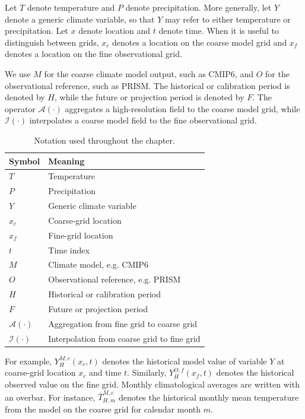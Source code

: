 \documentclass[11pt]{article}
\begin{document}
Let $T$ denote temperature and $P$ denote precipitation. More generally, let $Y$ denote a generic climate variable, so that $Y$ may refer to either temperature or precipitation. Let $x$ denote location and $t$ denote time. When it is useful to distinguish between grids, $x_c$ denotes a location on the coarse model grid and $x_f$ denotes a location on the fine observational grid.

We use $M$ for the coarse climate model output, such as CMIP6, and $O$ for the observational reference, such as PRISM. The historical or calibration period is denoted by $H$, while the future or projection period is denoted by $F$. The operator $\mathcal{A}(\cdot)$ aggregates a high-resolution field to the coarse model grid, while $\mathcal{I}(\cdot)$ interpolates a coarse model field to the fine observational grid.

\begin{table}[h]
\centering
\begin{tabular}{ll}
\toprule
Symbol & Meaning \\
\midrule
$T$ & Temperature \\
$P$ & Precipitation \\
$Y$ & Generic climate variable \\
$x_c$ & Coarse-grid location \\
$x_f$ & Fine-grid location \\
$t$ & Time index \\
$M$ & Climate model, e.g. CMIP6 \\
$O$ & Observational reference, e.g. PRISM \\
$H$ & Historical or calibration period \\
$F$ & Future or projection period \\
$\mathcal{A}(\cdot)$ & Aggregation from fine grid to coarse grid \\
$\mathcal{I}(\cdot)$ & Interpolation from coarse grid to fine grid \\
\bottomrule
\end{tabular}
\caption{Notation used throughout the chapter.}
\end{table}

For example, $Y_H^{M,c}(x_c,t)$ denotes the historical model value of variable $Y$ at coarse-grid location $x_c$ and time $t$. Similarly, $Y_H^{O,f}(x_f,t)$ denotes the historical observed value on the fine grid. Monthly climatological averages are written with an overbar. For instance, $\overline{T}_{H,m}^{M,c}$ denotes the historical monthly mean temperature from the model on the coarse grid for calendar month $m$.
\end{document}
